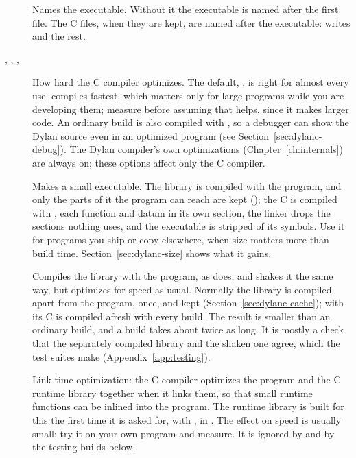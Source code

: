 \begin{description}
\item[ ] 
  Names the executable. Without it the executable is named after the
  first file. The C files, when they are kept, are named after the
  executable:  writes  and the rest.

\item[, , , ]
  How hard the C compiler optimizes. The default, , is right for
  almost every use.  compiles fastest, which matters only for
  large programs while you are developing them; measure before assuming
  that  helps, since it makes larger code. An
  ordinary build is also compiled with , so a debugger can show
  the Dylan source even in an optimized program (see
  Section~\ref{sec:dylanc-debug}). The Dylan compiler's own optimizations
  (Chapter~\ref{ch:internals}) are always on; these options affect only
  the C compiler.

\item[] 
  Makes a small executable. The library is compiled with the program,
  and only the parts of it the program can reach are kept (); the C is compiled with , each function and datum in
  its own section, the linker drops the sections nothing uses, and the
  executable is stripped of its symbols. Use it for programs you ship or
  copy elsewhere, when size matters more than build time. Section~\ref{sec:dylanc-size}
  shows what it gains.

\item[]
  Compiles the library with the program, as  does, and shakes it
  the same way, but optimizes for speed as usual. Normally the library is
  compiled apart from the program, once, and kept
  (Section~\ref{sec:dylanc-cache}); with  its C is compiled
  afresh with every build. The result is smaller than an ordinary build,
  and a build takes about twice as long. It is mostly a check that the
  separately compiled library and the shaken one agree, which the test
  suites make (Appendix~\ref{app:testing}).

\item[] 
  Link-time optimization: the C compiler optimizes the program and the C
  runtime library together when it links them, so that small runtime
  functions can be inlined into the program. The runtime library is built
  for this the first time it is asked for, with , in
  . The effect on speed is usually
  small; try it on your own program and measure. It is ignored by
   and by the testing builds below.


\end{description}
